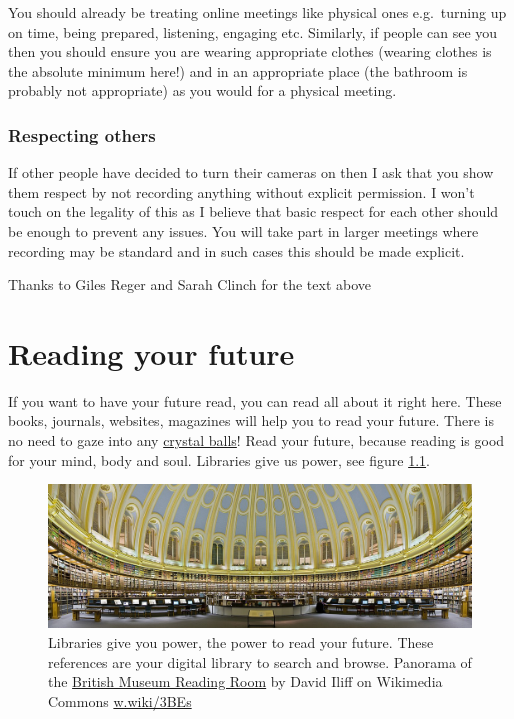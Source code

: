 \documentclass[
]{book}
\begin{document}
You should already be treating online meetings like physical ones e.g.~turning up on time, being prepared, listening, engaging etc. Similarly, if people can see you then you should ensure you are wearing appropriate clothes (wearing clothes is the absolute minimum here!) and in an appropriate place (the bathroom is probably not appropriate) as you would for a physical meeting.

\hypertarget{respecting-others}{%
\subsection{Respecting others}\label{respecting-others}}

If other people have decided to turn their cameras on then I ask that you show them respect by not recording anything without explicit permission. I won't touch on the legality of this as I believe that basic respect for each other should be enough to prevent any issues. You will take part in larger meetings where recording may be standard and in such cases this should be made explicit.

Thanks to Giles Reger and Sarah Clinch for the text above 🙏

\hypertarget{reading}{%
\chapter{Reading your future}\label{reading}}

If you want to have your future read, you can read all about it right here. These books, journals, websites, magazines will help you to read your future. There is no need to gaze into any \href{https://en.wikipedia.org/wiki/Crystal_ball}{crystal balls}! Read your future, because reading is good for your mind, body and soul. Libraries give us power, see figure \ref{fig:library-power-fig}.

\begin{figure}

{\centering \includegraphics[width=1\linewidth]{images/Libraries_Give_Us_Power} 

}

\caption{Libraries give you power, the power to read your future. These references are your digital library to search and browse. Panorama of the \href{https://en.wikipedia.org/wiki/British_Museum_Reading_Room}{British Museum Reading Room} by David Iliff on Wikimedia Commons \href{https://w.wiki/3BEs}{w.wiki/3BEs}}\label{fig:library-power-fig}
\end{figure}
\end{document}
